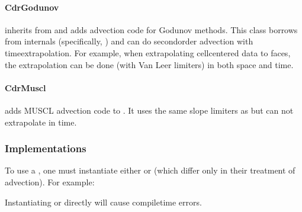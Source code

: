 \documentclass[letterpaper,10pt,english]{sphinxmanual}
\begin{document}
\paragraph{CdrGodunov}
\label{\detokenize{Solvers/CDR:cdrgodunov}}
 inherits from  and adds advection code for Godunov methods.
This class borrows from  internals (specifically, ) and can do second\sphinxhyphen{}order advection with time\sphinxhyphen{}extrapolation.
For example, when extrapolating cell\sphinxhyphen{}centered data to faces, the extrapolation can be done (with Van Leer limiters) in both space and time.


\paragraph{CdrMuscl}
\label{\detokenize{Solvers/CDR:cdrmuscl}}
 adds MUSCL advection code to .
It uses the same slope limiters as  but can not extrapolate in time.


\subsubsection{Implementations}
\label{\detokenize{Solvers/CDR:implementations}}
To use a , one must instantiate either  or  (which differ only in their treatment of advection).
For example:

\begin{sphinxVerbatim}[commandchars=\\\{\},formatcom=\scriptsize]
     
      

\end{sphinxVerbatim}

Instantiating  or  directly will cause compile\sphinxhyphen{}time errors.
\end{document}
